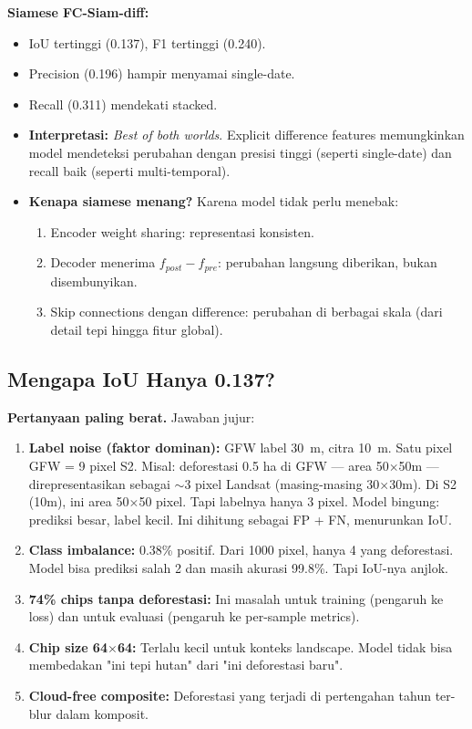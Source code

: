 \documentclass[10pt,a4paper,onecolumn]{article}
\begin{document}
\textbf{Siamese FC-Siam-diff:}
\begin{itemize}[nosep]
    \item IoU tertinggi (0.137), F1 tertinggi (0.240).
    \item Precision (0.196) hampir menyamai single-date.
    \item Recall (0.311) mendekati stacked.
    \item \textbf{Interpretasi:} \textit{Best of both worlds}.
          Explicit difference features memungkinkan model mendeteksi
          perubahan dengan presisi tinggi (seperti single-date) dan
          recall baik (seperti multi-temporal).
    \item \textbf{Kenapa siamese menang?} Karena model tidak perlu
          menebak:
          \begin{enumerate}[nosep]
              \item Encoder weight sharing: representasi konsisten.
              \item Decoder menerima $f_{post} - f_{pre}$: perubahan
                    langsung diberikan, bukan disembunyikan.
              \item Skip connections dengan difference: perubahan di
                    berbagai skala (dari detail tepi hingga fitur
                    global).
          \end{enumerate}
\end{itemize}

\subsection{Mengapa IoU Hanya 0.137?}

\textbf{Pertanyaan paling berat.} Jawaban jujur:

\begin{enumerate}[nosep]
    \item \textbf{Label noise (faktor dominan):} GFW label 30~m,
          citra 10~m. Satu pixel GFW = 9 pixel S2. Misal: deforestasi
          0.5 ha di GFW — area 50$\times$50m — direpresentasikan
          sebagai $\sim$3 pixel Landsat (masing-masing 30$\times$30m).
          Di S2 (10m), ini area 50$\times$50 pixel. Tapi labelnya
          hanya 3 pixel. Model bingung: prediksi besar, label kecil.
          Ini dihitung sebagai FP + FN, menurunkan IoU.
    \item \textbf{Class imbalance:} 0.38\% positif. Dari 1000 pixel,
          hanya 4 yang deforestasi. Model bisa prediksi salah 2 dan
          masih akurasi 99.8\%. Tapi IoU-nya anjlok.
    \item \textbf{74\% chips tanpa deforestasi:} Ini masalah untuk
          training (pengaruh ke loss) dan untuk evaluasi (pengaruh ke
          per-sample metrics).
    \item \textbf{Chip size 64$\times$64:} Terlalu kecil untuk konteks
          landscape. Model tidak bisa membedakan "ini tepi hutan"
          dari "ini deforestasi baru".
    \item \textbf{Cloud-free composite:} Deforestasi yang terjadi di
          pertengahan tahun ter-blur dalam komposit.
\end{enumerate}
\end{document}
